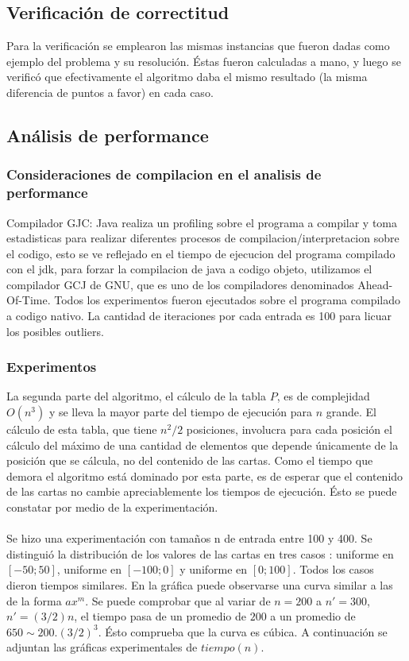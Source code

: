 \subsection{Verificaci\'on de correctitud}
Para la verificaci\'on se emplearon las mismas instancias que fueron dadas como ejemplo del problema y su resoluci\'on. \'Estas fueron calculadas a mano, y luego se verific\'o que efectivamente el algoritmo daba el mismo resultado (la misma diferencia de puntos a favor) en cada caso.

\subsection{An\'alisis de performance}
\subsubsection{Consideraciones de compilacion en el analisis de performance}
Compilador GJC: Java realiza un profiling sobre el programa a compilar y toma estadisticas para realizar diferentes procesos de compilacion/interpretacion sobre el codigo, esto se ve reflejado en el tiempo de ejecucion del programa compilado con el jdk, para forzar la compilacion de java a codigo objeto, utilizamos el compilador GCJ de GNU, que es uno de los compiladores denominados Ahead-Of-Time. Todos los experimentos fueron ejecutados sobre el programa compilado a codigo nativo. La cantidad de iteraciones por cada entrada es 100 para licuar los posibles outliers.

\subsubsection{Experimentos}
La segunda parte del algoritmo, el c\'alculo de la tabla $P$, es de complejidad $O(n^3)$ y se lleva la mayor parte del tiempo de ejecuci\'on para $n$ grande.
El c\'alculo de esta tabla, que tiene $n^2/2$ posiciones, involucra para cada posici\'on el c\'alculo del m\'aximo de una cantidad de elementos que depende \'unicamente de la posici\'on que se c\'alcula, no del contenido de las cartas. Como el tiempo que demora el algoritmo est\'a dominado por esta parte, es de esperar que el contenido de las cartas no cambie apreciablemente los tiempos de ejecuci\'on. \'Esto se puede constatar por medio de la experimentaci\'on.\\
\\
Se hizo una experimentaci\'on con tama\~nos n de entrada entre 100 y 400. Se distingui\'o la distribuci\'on de los valores de las cartas en tres casos : uniforme en $[-50;50]$, uniforme en $[-100;0]$ y uniforme en $[0;100]$. Todos los casos dieron tiempos similares. En la gr\'afica puede observarse una curva similar a las de la forma $ax^{m}$. Se puede comprobar que al variar de $n=200$ a $n'=300$, $n'=(3/2)n$, el tiempo pasa de un promedio de $200$ a un promedio de $650 \sim 200.(3/2)^3$. \'Esto comprueba que la curva es c\'ubica.
A continuaci\'on se adjuntan las gr\'aficas experimentales de $tiempo(n)$.

